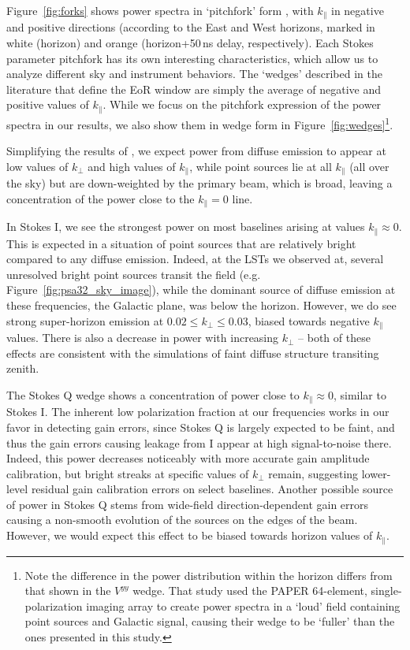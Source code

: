 Figure~\ref{fig:forks} shows power spectra in `pitchfork' form \citep{Nithya.15a,Nithya.15b}, with $k_{\parallel}$ in negative and positive directions (according to the East and West horizons, marked in white (horizon) and orange (horizon+50\,ns delay, respectively). Each Stokes parameter pitchfork has its own interesting characteristics, which allow us to analyze different sky and instrument behaviors. The `wedges' described in the literature that define the EoR window are simply the average of negative and positive values of $k_{\parallel}$. While we focus on the pitchfork expression of the power spectra in our results, we also show them in wedge form in Figure~\ref{fig:wedges}\footnote{Note the difference in the power distribution within the horizon differs from that shown in the \citet{Pober.13} $V^{yy}$ wedge. That study used the PAPER 64-element, single-polarization imaging array to create power spectra in a `loud' field containing point sources and Galactic signal, causing their wedge to be `fuller' than the ones presented in this study.}.

Simplifying the results of \citet[][see their papers for a full discussion]{Nithya.15a,Nithya.15b}, we expect power from diffuse emission to appear at low values of $k_{\perp}$ and high values of $k_{\parallel}$, while point sources lie at all $k_{\parallel}$ (all over the sky) but are down-weighted by the primary beam, which is broad, leaving a concentration of the power close to the $k_{\parallel}=0$ line.

In Stokes I, we see the strongest power on most baselines arising at values $k_{\parallel}\approx 0$. This is expected in a situation of point sources that are relatively bright compared to any diffuse emission. Indeed, at the LSTs we observed at, several unresolved bright point sources transit the field (e.g. Figure~{\ref{fig:psa32_sky_image}}), while the dominant source of diffuse emission at these frequencies, the Galactic plane, was below the horizon. However, we do see strong super-horizon emission at $0.02 \leqslant k_{\perp} \leqslant 0.03$, biased towards negative $k_{\parallel}$ values. There is also a decrease in power with increasing $k_{\perp}$ -- both of these effects are consistent with the \citet{Nithya.15b} simulations of faint diffuse structure transiting zenith. 

The Stokes Q wedge shows a concentration of power close to $k_{\parallel}\approx 0$, similar to Stokes I.
The inherent low polarization fraction at our frequencies works in our favor in detecting gain errors, since Stokes Q is largely expected to be faint, and thus the gain errors causing leakage from I appear at high signal-to-noise there.
Indeed, this power decreases noticeably with more accurate gain amplitude calibration, but bright streaks at specific values of $k_{\perp}$ remain, suggesting lower-level residual gain calibration errors on select baselines.  Another possible source of power in Stokes Q stems from wide-field direction-dependent gain errors causing a non-smooth evolution of the sources on the edges of the beam. However, we would expect this effect to be biased towards horizon values of $k_{\parallel}$.

